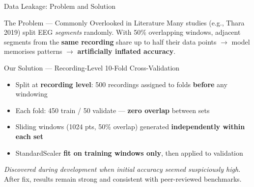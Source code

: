 \documentclass[aspectratio=169,12pt]{beamer}
\begin{document}
\begin{frame}{Data Leakage: Problem and Solution}
\begin{block}{The Problem --- Commonly Overlooked in Literature}
\small
Many studies (e.g., Thara 2019) split EEG \textit{segments} randomly. With 50\% overlapping windows, adjacent segments from the \textbf{same recording} share up to half their data points $\rightarrow$ model memorises patterns $\rightarrow$ \textbf{artificially inflated accuracy}.
\end{block}

\vspace{0.1cm}
\begin{block}{Our Solution --- Recording-Level 10-Fold Cross-Validation}
\small
\begin{itemize}\itemsep0pt
    \item Split at \textbf{recording level}: 500 recordings assigned to folds \textbf{before} any windowing
    \item Each fold: 450 train / 50 validate --- \textbf{zero overlap} between sets
    \item Sliding windows (1024 pts, 50\% overlap) generated \textbf{independently within each set}
    \item StandardScaler \textbf{fit on training windows only}, then applied to validation
\end{itemize}
\end{block}

\vspace{0.05cm}
\centering
{\scriptsize\textit{Discovered during development when initial accuracy seemed suspiciously high.} After fix, results remain strong and consistent with peer-reviewed benchmarks.}
\end{frame}
\end{document}
